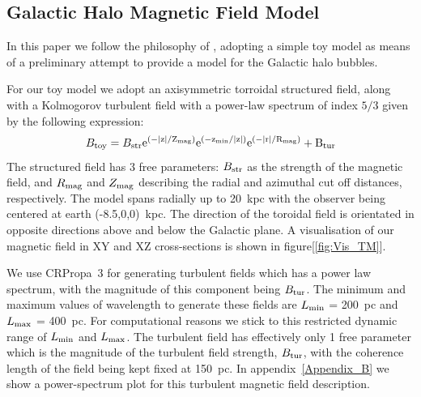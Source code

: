 \documentclass[usenatbib]{mnras}
\begin{document}
\subsection{Galactic Halo Magnetic Field Model}
\label{GMF}
In this paper we follow the philosophy of \cite{West_Helicity}, adopting a simple toy model as means of a preliminary attempt to provide a model for the Galactic halo bubbles. 

For our toy model we adopt an axisymmetric torroidal structured field, along with a Kolmogorov turbulent field with a power-law spectrum of index $5/3$ given by the following expression:
\begin{equation}\label{TM_equation}
B_{\rm{toy}}= B_{\rm{str}}\rm{e}^{{(-|z|}/Z_{\rm{mag}})} \rm{e}^{(-z_{\rm{min}}/|z|)}\rm{e}^{(-|r|/R_{\rm{mag}})} + B_{\rm{tur}}
\end{equation}
The structured field has 3 free parameters: $B_{\rm str}$ as the strength of the magnetic field, and $R_{\rm {mag}}$ and $Z_{\rm {mag}}$ describing the radial and azimuthal cut off distances, respectively. The model spans radially up to 20~kpc with the observer being centered at earth (-8.5,0,0)~kpc. The direction of the toroidal field is orientated in opposite directions above and below the Galactic plane. A visualisation of our magnetic field in XY and XZ cross-sections is shown in figure[\ref{fig:Vis_TM}]. 

We use CRPropa~3 \cite{CRPropa3_2016} for generating turbulent fields which has a power law spectrum, with the magnitude of this component being $B_{\rm{tur}}$. 
The minimum and maximum values of wavelength to generate these fields are  $L_{\rm min}$ = 200~pc and $L_{\rm max}$ = 400~pc. For computational reasons we stick to this restricted dynamic range of $L_{\rm min}$ and $L_{\rm max}$. The turbulent field has effectively only 1 free parameter which is the magnitude of the turbulent field strength, $ B_{\rm tur}$, with the coherence length of the field being kept fixed at 150~pc.  In appendix~\ref{Appendix_B} we show a power-spectrum plot for this turbulent magnetic field description.
\end{document}

